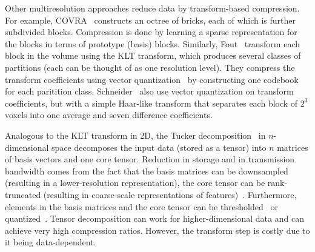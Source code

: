 Other multiresolution approaches reduce data by transform-based compression. For example,
COVRA~\cite{covra2012} constructs an octree of bricks, each of which is further subdivided blocks.
Compression is done by learning a sparse representation for the blocks in terms of prototype (basis)
blocks. Similarly, Fout\etal~\cite{hw_dvr2007} transform each block in the volume using the KLT
transform, which produces several classes of partitions (each can be thought of as one resolution
level). They compress the transform coefficients using vector quantization~\cite{vq1992} by
constructing one codebook for each paritition class. Schneider\etal~\cite{compression_domain2003}
also use vector quantization on transform coefficients, but with a simple Haar-like transform that
separates each block of $2^3$ voxels into one average and seven difference coefficients.

Analogous to the KLT transform in 2D, the Tucker decomposition~\cite{tensor_dvr2015} in
$n$-dimensional space decomposes the input data (stored as a tensor) into $n$ matrices of basis
vectors and one core tensor. Reduction in storage and in transmission bandwidth comes from the fact
that the basis matrices can be downsampled (resulting in a lower-resolution representation), the
core tensor can be rank-truncated (resulting in coarse-scale representations of
features)~\cite{tamresh,tucker-thresholding,multiscale-tensor}. Furthermore, elements in the basis
matrices and the core tensor can be thresholded~\cite{tucker-thresholding} or
quantized~\cite{tamresh,multiscale-tensor}. Tensor decomposition can work for higher-dimensional
data and can achieve very high compression ratios. However, the transform step is costly due to it
being data-dependent.

